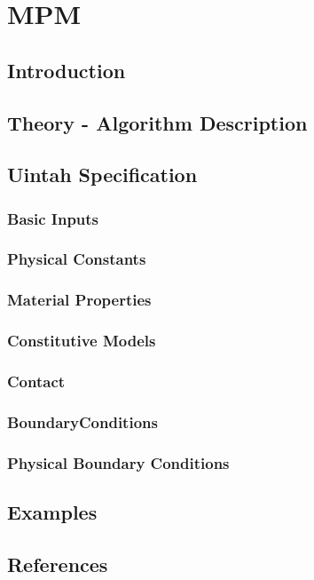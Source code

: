 
\section{MPM}

\subsection{Introduction}

\subsection{Theory - Algorithm Description}

\subsection{Uintah Specification}

\subsubsection{Basic Inputs}
\subsubsection{Physical Constants}
\subsubsection{Material Properties}
\subsubsection{Constitutive Models}
\subsubsection{Contact}
\subsubsection{BoundaryConditions}
\subsubsection{Physical Boundary Conditions}

\subsection{Examples}

\subsection{References}
